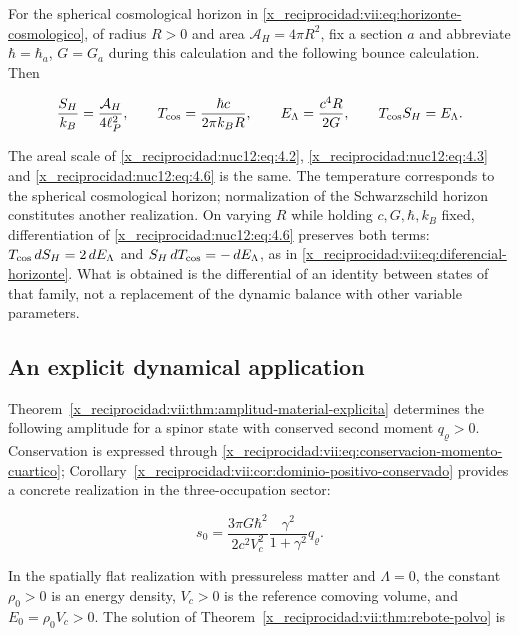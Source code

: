 For the spherical cosmological horizon in \eqref{x_reciprocidad:vii:eq:horizonte-cosmologico}, of radius \(R>0\) and area \(\mathcal A_H=4\pi R^2\), fix a section \(a\) and abbreviate \(\hbar=\hbar_a\), \(G=G_a\) during this calculation and the following bounce calculation. Then



\begin{equation}
\frac{S_H}{k_B}=\frac{\mathcal A_H}{4\ell_P^2},\qquad
T_{\rm cos}=\frac{\hbar c}{2\pi k_BR},\qquad
E_\Lambda=\frac{c^4R}{2G},\qquad T_{\rm cos}S_H=E_\Lambda .
\label{x_reciprocidad:nuc12:eq:4.6}
\end{equation}



The areal scale of \eqref{x_reciprocidad:nuc12:eq:4.2}, \eqref{x_reciprocidad:nuc12:eq:4.3} and \eqref{x_reciprocidad:nuc12:eq:4.6} is the same. The temperature corresponds to the spherical cosmological horizon; normalization of the Schwarzschild horizon constitutes another realization. On varying \(R\) while holding \(c,G,\hbar,k_B\) fixed, differentiation of \eqref{x_reciprocidad:nuc12:eq:4.6} preserves both terms: \(T_{\rm cos}\,dS_H=2\,dE_\Lambda\) and \(S_H\,dT_{\rm cos}=-\,dE_\Lambda\), as in \eqref{x_reciprocidad:vii:eq:diferencial-horizonte}. What is obtained is the differential of an identity between states of that family, not a replacement of the dynamic balance with other variable parameters.

\subsection{An explicit dynamical application}

Theorem~\ref{x_reciprocidad:vii:thm:amplitud-material-explicita} determines the following amplitude for a spinor state with conserved second moment \(q_\varrho>0\). Conservation is expressed through \eqref{x_reciprocidad:vii:eq:conservacion-momento-cuartico}; Corollary~\ref{x_reciprocidad:vii:cor:dominio-positivo-conservado} provides a concrete realization in the three-occupation sector:



\begin{equation}
s_0=\frac{3\pi G\hbar^2}{2c^2V_c^2}
\frac{\gamma^2}{1+\gamma^2}q_\varrho .
\label{x_reciprocidad:nuc12:eq:4.7}
\end{equation}



In the spatially flat realization with pressureless matter and \(\Lambda=0\), the constant \(\rho_0>0\) is an energy density, \(V_c>0\) is the reference comoving volume, and \(E_0=\rho_0V_c>0\). The solution of Theorem~\ref{x_reciprocidad:vii:thm:rebote-polvo} is



